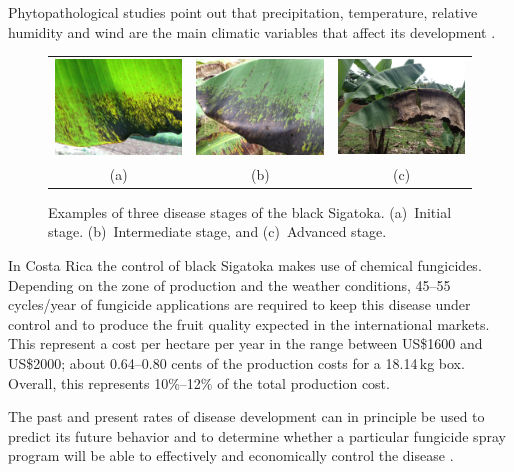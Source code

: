 \documentclass[review]{elsarticle}
\begin{document}
Phytopathological studies point out that precipitation, temperature,
relative humidity and wind are the main climatic variables that affect
its development \citep{MarinVargas1995}.
 	 
\begin{figure}[h] 
\centering
\begin{tabular}{c@{\;}c@{\;}c}
  \includegraphics[width=.32\linewidth]{Roya_a} &
  \includegraphics[width=.32\linewidth]{Roya_b} &
  \includegraphics[width=.32\linewidth]{Roya_c} \\
  (a) & (b) & (c) 
\end{tabular}
\caption{Examples of three disease stages of the black Sigatoka. (a)~Initial stage. (b)~Intermediate stage, and (c)~Advanced stage.} 
\label{fig:diseasestages} 
\end{figure}

In Costa Rica the control of black Sigatoka makes use of chemical fungicides.
%
Depending on the zone of production and the weather conditions, 45--55
cycles/year of fungicide applications are required to keep this
disease under control and to produce the fruit quality expected in the
international markets.
%
This represent a cost per hectare per year in the range between US\$1600 and
US\$2000; about 0.64--0.80 cents of the production costs for a
18.14\,kg box.
%
Overall, this represents 10\%--12\% of the total production cost.

The past and present rates of disease development can in principle be used
to predict its future behavior and to determine whether
a particular fungicide spray program will be able to effectively and
economically control the disease \citet{ChuangJeger1987}.
\end{document}
